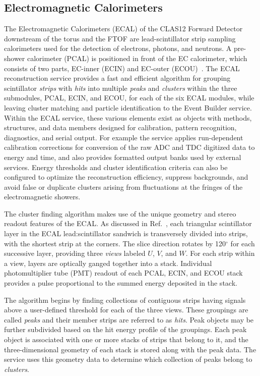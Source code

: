 \subsection{Electromagnetic Calorimeters}

The Electromagnetic Calorimeters (ECAL) of the CLAS12 Forward Detector downstream of the torus and the
FTOF are lead-scintillator strip sampling calorimeters used for the detection of electrons, photons, and
neutrons. A pre-shower calorimeter (PCAL) is positioned in front of the EC calorimeter, which consists of two
parts, EC-inner (ECIN) and EC-outer (ECOU)~\cite{ecal-nim}. The ECAL reconstruction service provides a fast
and efficient algorithm for grouping scintillator {\it strips} with {\it hits} into multiple {\it peaks} and {\it clusters}
within the three submodules, PCAL, ECIN, and ECOU, for each of the six ECAL modules, while leaving cluster
matching and particle identification to the Event Builder service. Within the ECAL service, these various elements
exist as objects with methods, structures, and data members designed for calibration, pattern recognition,
diagnostics, and serial output. For example the service applies run-dependent calibration corrections for conversion
of the raw ADC and TDC digitized data to energy and time, and also provides formatted output banks used by
external services.  Energy thresholds and cluster identification criteria can also be configured to optimize the
reconstruction efficiency, suppress backgrounds, and avoid false or duplicate clusters arising from fluctuations at
the fringes of the electromagnetic showers.

The cluster finding algorithm makes use of the unique geometry and stereo readout features of the ECAL. As
discussed in Ref.~\cite{ecal-nim}, each triangular scintillator layer in the ECAL lead:scintillator sandwich is
transversely divided into strips, with the shortest strip at the corners. The slice direction rotates by 120$^\circ$
for each successive layer, providing three {\it views} labeled $U$, $V$, and $W$.  For each strip within a view,
layers are optically ganged together into a stack.  Individual photomultiplier tube (PMT) readout of each PCAL, ECIN,
and ECOU stack provides a pulse proportional to the summed energy deposited in the stack.

The algorithm begins by finding collections of contiguous strips having signals above a user-defined threshold for
each of the three views. These groupings are called {\it peaks} and their member strips are referred to as
{\it hits}.  Peak objects may be further subdivided based on the hit energy profile of the groupings. Each peak
object is associated with one or more stacks of strips that belong to it, and the three-dimensional geometry of each
stack is stored along with the peak data. The service uses this geometry data to determine which collection of
peaks belong to {\it clusters}.


